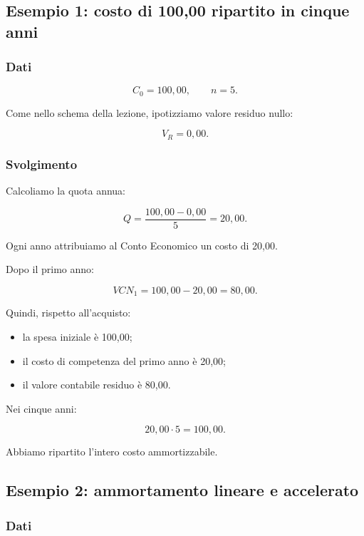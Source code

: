 \subsection{Esempio 1:
costo di 100,00 ripartito in cinque anni}

\subsubsection*{Dati}

\[
C_0=100{,}00,
\qquad
n=5.
\]

\noindent Come nello schema della lezione,
ipotizziamo valore residuo nullo:

\[
V_R=0{,}00.
\]


\subsubsection*{Svolgimento}

\noindent Calcoliamo la quota annua:

\[
Q=\frac{100{,}00-0{,}00}{5}
=
\boxed{20{,}00}.
\]

\noindent Ogni anno attribuiamo
al Conto Economico
un costo di 20,00.

\noindent Dopo il primo anno:

\[
VCN_1=100{,}00-20{,}00
=
\boxed{80{,}00}.
\]

\noindent Quindi, rispetto all'acquisto:

\begin{itemize}
    \item la spesa iniziale è 100,00;
    \item il costo di competenza
    del primo anno è 20,00;
    \item il valore contabile residuo
    è 80,00.
\end{itemize}

\noindent Nei cinque anni:

\[
20{,}00\cdot5=100{,}00.
\]

\noindent Abbiamo ripartito
l'intero costo ammortizzabile.


\subsection{Esempio 2:
ammortamento lineare e accelerato}

\subsubsection*{Dati}

